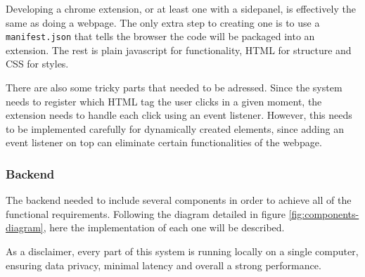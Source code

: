 Developing a chrome extension, or at least one with a sidepanel, is effectively the same as doing a webpage. The only extra step to creating one is to use a \verb|manifest.json| that tells the browser the code will be packaged into an extension. The rest is plain javascript for functionality, HTML for structure and CSS for styles. 

There are also some tricky parts that needed to be adressed. Since the system needs to register which HTML tag the user clicks in a given moment, the extension needs to handle each click using an event listener. However, this needs to be implemented carefully for dynamically created elements, since adding an event listener on top can eliminate certain functionalities of the webpage.

\subsubsection{Backend}

The backend needed to include several components in order to achieve all of the functional requirements. Following the diagram detailed in figure \ref{fig:components-diagram}, here the implementation of each one will be described.

As a disclaimer, every part of this system is running locally on a single computer, ensuring data privacy, minimal latency and overall a strong performance.

